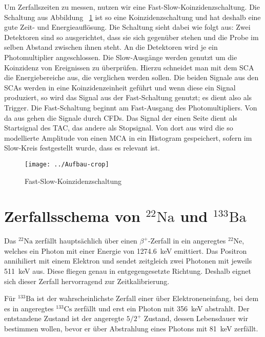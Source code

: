 \documentclass[11pt, ngerman, fleqn, DIV=15, headinclude, BCOR=2cm]{scrreprt}
\begin{document}
Um Zerfallszeiten zu messen, nutzen wir eine Fast-Slow-Koinzidenzschaltung.
Die Schaltung aus Abbildung ~\ref{fig:aufbau} ist so eine
Koinzidenzschaltung und hat deshalb eine gute Zeit- und Energieauflösung. 
Die Schaltung sieht dabei wie folgt aus: 
Zwei Detektoren sind so ausgerichtet, dass sie sich gegenüber stehen und die
Probe im selben Abstand zwischen ihnen steht. An die Detektoren wird je ein
Photomultiplier angeschlossen. Die Slow-Ausgänge werden genutzt um die
Koinzidenz von Ereignissen zu überprüfen. Hierzu schneidet man mit dem SCA die
Energiebereiche aus, die verglichen werden sollen. Die beiden Signale aus den
SCAs werden in eine Koinzidenzeinheit geführt und wenn diese ein Signal
produziert, so wird das Signal aus der Fast-Schaltung genutzt; es dient also
als Trigger. Die Fast-Schaltung beginnt am Fast-Ausgang des Photomultipliers.
Von da aus gehen die Signale durch CFDs. Das Signal der einen Seite dient als
Startsignal des TAC, das andere als Stopsignal. Von dort aus wird die so
modellierte Amplitude von einen MCA in ein Histogram gespeichert, sofern im
Slow-Kreis festgestellt wurde, dass es relevant ist.


\begin{figure}[htbp]
    \centering
    \texttt{[image: ../Aufbau-crop]}
    \caption{%
        Fast-Slow-Koinzidenzschaltung
    }
    \label{fig:aufbau}
\end{figure}

\section{Zerfallsschema von $^{22}\text{Na}$ und $^{133}\text{Ba}$}

Das $^{22}\text{Na}$ zerfällt hauptsächlich über einen $\beta^+$-Zerfall in ein
angeregtes $^{22}\text{Ne}$, welches ein Photon mit einer Energie von
\SI{1274,6}{\kilo\electronvolt} emittiert. Das Positron annihiliert mit einem
Elektron und sendet zeitgleich zwei Photonen mit jeweils \SI{511}{\kilo\electronvolt}
aus. Diese fliegen genau in entgegengesetzte Richtung. Deshalb eignet
sich dieser Zerfall hervorragend zur Zeitkalibrierung. 

Für $^{133}\text{Ba}$ ist der wahrscheinlichste Zerfall einer über
Elektroneneinfang, bei dem es in angeregtes $^{133}\text{Cs}$ zerfällt und erst
ein Photon mit \SI{356}{\kilo\electronvolt} abstrahlt. Der entstandene
Zustand ist der angeregte $5/2^+$ Zustand, dessen Lebensdauer wir
bestimmen wollen, bevor er über Abstrahlung eines Photons mit \SI{81}{\kilo\electronvolt}
zerfällt.
\end{document}
